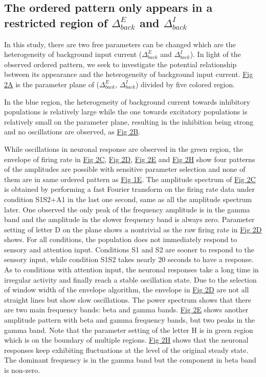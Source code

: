 \documentclass[10pt,letterpaper]{article}
\begin{document}
\subsection*{The ordered pattern only appears in a restricted region of $\Delta_{back}^{E}$ and $\Delta_{back}^{I}$}
In this study, there are two free parameters can be changed which are the heterogeneity of background input current ($\Delta_{back}^{E}$ and $\Delta_{back}^{I}$). In light of the observed ordered pattern, we seek to investigate the potential relationship between its appearance and the heterogeneity of background input current. \hyperlink{fig:fig2}{Fig 2A} is the parameter plane of ($\Delta_{back}^{E}$, $\Delta_{back}^{I}$) divided by five colored region. 

In the blue region, the heterogeneity of background current towards inhibitory populations is relatively large while the one towards excitatory populations is relatively small on the parameter plane, resulting in the inhibition being strong and no oscillations are observed, as \hyperlink{fig:fig2}{Fig 2B}. 

While oscillations in neuronal response are observed in the green region, the envelope of firing rate in \hyperlink{fig:fig2}{Fig 2C}, \hyperlink{fig:fig2}{Fig 2D}, \hyperlink{fig:fig2}{Fig 2E} and \hyperlink{fig:fig2}{Fig 2H} show four patterns of the amplitudes are possible with sensitive parameter selection and none of them are in same ordered pattern as \hyperlink{fig:fig1}{Fig 1E}.
The amplitude spectrum of \hyperlink{fig:fig1}{Fig 2C} is obtained by performing a fast Fourier transform on the firing rate data under condition S1S2+A1 in the last one second, same as all the amplitude spectrum later. One observed the only peak of the frequency amplitude is in the gamma band and the amplitude in the slower frequency band is always zero. Parameter setting of letter D on the plane shows a nontrivial as the raw firing rate in \hyperlink{fig:fig2}{Fig 2D} shows. For all conditions, the population does not immediately respond to sensory and attention input. Conditions S1 and S2 are sooner to respond to the sensory input, while condition S1S2 takes nearly 20 seconds to have a response. As to conditions with attention input, the neuronal responses take a long time in irregular activity and finally reach a stable oscillation state. Due to the selection of window width of the envelope algorithm, the envelope in \hyperlink{fig:fig2}{Fig 2D} are not all straight lines but show slow oscillations. The power spectrum shows that there are two main frequency bands: beta and gamma bands. \hyperlink{fig: fig2}{Fig 2E} shows another amplitude pattern with beta and gamma frequency bands, but two peaks in the gamma band. Note that the parameter setting of the letter H is in green region which is on the boundary of multiple regions. \hyperlink{fig:fig2}{Fig 2H} shows that the neuronal responses keep exhibiting fluctuations at the level of the original steady state. The dominant frequency is in the gamma band but the component in beta band is non-zero. 
\end{document}
